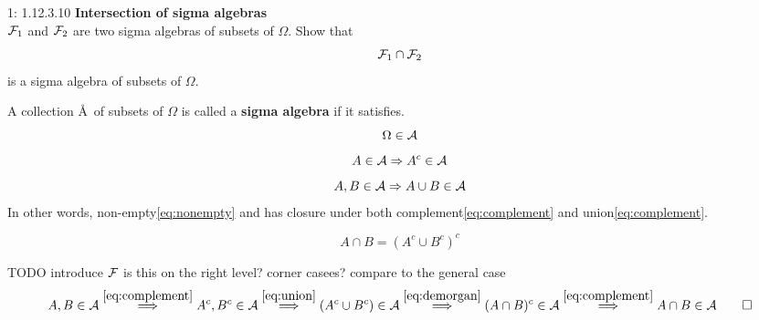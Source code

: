 \documentclass[a4paper,twoside=false,abstract=false,numbers=noenddot,
titlepage=false,headings=small,parskip=half,version=last]{scrartcl}
\begin{document}

\begin{exercise}{1: 1.12.3.10} {\bf Intersection of sigma algebras}   \\
    $\FF_1$ and $\FF_2$ are two sigma algebras of subsets of $\Omega$. Show
    that
    \begin{equation}
        \FF_1 \cap \FF_2
    \end{equation}
    is a sigma algebra of subsets of $\Omega$.
\end{exercise}
\begin{solution}
    \begin{definition}
        A collection \AA\, of subsets of $\Omega$ is called a \textbf{sigma
        algebra} if it satisfies.
        \begin{equation}
            \label{eq:nonempty}
            \Omega \in \AA
        \end{equation}
        \begin{equation}
            \label{eq:complement}
            A\in \AA \Rightarrow A^c \in \AA
        \end{equation}
        \begin{equation}
            \label{eq:union}
            A, B\in \AA \Rightarrow A\cup B \in \AA
        \end{equation}
        In other words, non-empty\eqref{eq:nonempty} and has closure under both
        complement\eqref{eq:complement} and union\eqref{eq:complement}.
    \end{definition}
    \begin{identity}
        \label{id:demorgan}
        \begin{equation}
            \label{eq:demorgan}
            A \cap B = (A^c \cup B^c)^c
        \end{equation}
    \end{identity}

    TODO introduce $\FF$ is this on the right level? corner casees? compare to
    the general case %
    \begin{equation}
        A, B \in \AA \stackrel{\eqref{eq:complement}}{\Longrightarrow}
        A^c, B^c \in \AA \stackrel{\eqref{eq:union}}{\Longrightarrow}
        (A^c \cup B^c) \in \AA \stackrel{\eqref{eq:demorgan}}{\Longrightarrow}
        (A \cap B)^c \in \AA \stackrel{\eqref{eq:complement}}{\Longrightarrow}
        A \cap B \in \AA \qed
    \end{equation}

%

\end{solution}
\pagebreak
\end{document}
